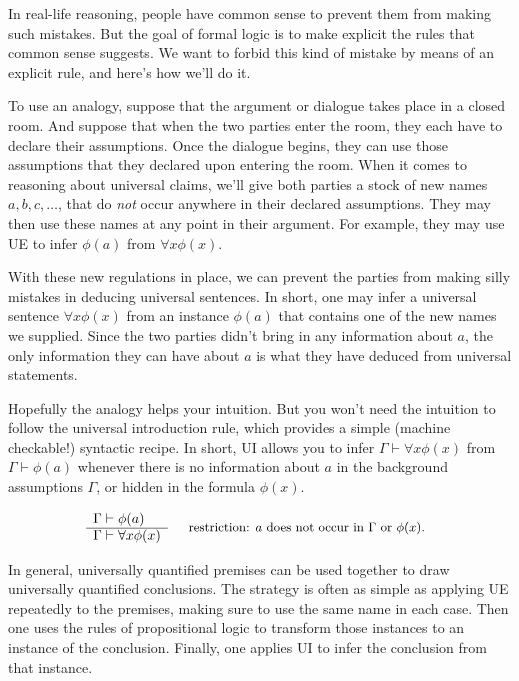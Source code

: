 In real-life reasoning, people have common sense to prevent them from
making such mistakes.  But the goal of formal logic is to make
explicit the rules that common sense suggests.  We want to forbid this
kind of mistake by means of an explicit rule, and here's how we'll do
it.

To use an analogy, suppose that the argument or dialogue takes place
in a closed room.  And suppose that when the two parties enter the
room, they each have to declare their assumptions.  Once the dialogue
begins, they can use those assumptions that they declared upon
entering the room.  When it comes to reasoning about universal claims,
we'll give both parties a stock of new names $a,b,c,\dots $, that do
{\it not} occur anywhere in their declared assumptions.  They may then
use these names at any point in their argument.  For example, they may
use UE to infer $\phi (a)$ from $\forall x\phi (x)$.

With these new regulations in place, we can prevent the parties from
making silly mistakes in deducing universal sentences.  In short, one
may infer a universal sentence $\forall x\phi (x)$ from an instance
$\phi (a)$ that contains one of the new names we supplied.  Since the
two parties didn't bring in any information about $a$, the only
information they can have about $a$ is what they have deduced from
universal statements.

Hopefully the analogy helps your intuition.  But you won't need the
intuition to follow the universal introduction rule, which provides a
simple (machine checkable!) syntactic recipe.  In short, UI allows you
to infer $\Gamma\vdash\forall x\phi (x)$ from $\Gamma\vdash \phi (a)$
whenever there is no information about $a$ in the background
assumptions $\Gamma$, or hidden in the formula $\phi (x)$.

\bigskip \begin{tcolorbox}[enhanced,width=10cm,title=Universal Introduction (UI),attach boxed title to top
  left={yshift=-2mm,xshift=4mm},boxed title style={sharp corners}]
\[ \begin{array}{r@{\; }c@{\; }l c@{\quad }p{6cm}}
       \Gamma & \vdash & \phi (a) & & \multirow{2}{6cm}{\small restriction: $a$ does not occur in $\Gamma$ or $\phi (x)$.} \\ \cline{1-3}
       \Gamma & \vdash & \forall x\phi (x) \end{array} \]  
 \end{tcolorbox} \smallskip

In general, universally quantified premises can be used together to
draw universally quantified conclusions.  The strategy is often as
simple as applying UE repeatedly to the premises, making sure to use
the same name in each case.  Then one uses the rules of propositional
logic to transform those instances to an instance of the conclusion.
Finally, one applies UI to infer the conclusion from that instance.


